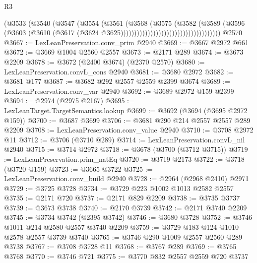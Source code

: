 \begin{lexlean}{R3}
\begin{coremodule}
                                                  (@3533
                                                    (@3540
                                                      (@3547
                                                        (@3554
                                                          (@3561
                                                            (@3568
                                                              (@3575
                                                                (@3582
                                                                  (@3589
                                                                    (@3596
                                                                      (@3603
                                                                        (@3610
                                                                          (@3617
                                                                            (@3624
                                                                              @3625)))))))))))))))))))))))))))))))))))))
    @2570
@3667 := LexLeanPreservation.conv_prim @2940
@3669 := @3667 @2972 @661
@3672 := @3669 @1004 @2560 @2557
@3673 := @2171 @289
@3674 := @3673 @2209
@3678 := @3672 (@2400 @3674) (@2370 @2570)
@3680 := LexLeanPreservation.convL_cons @2940
@3681 := @3680 @2972
@3682 := @3681 @177
@3687 := @3682 @292 @2557 @2559 @2399 @3674
@3689 := LexLeanPreservation.conv_var @2940
@3692 := @3689 @2972 @159 @2399
@3694 := @2974 (@2975 @2167)
@3695 := LexLeanTarget.TargetSemantics.lookup
@3699 := @3692 (@3694 (@3695 @2972 @159))
@3700 := @3687 @3699
@3706 := @3681 @290 @214 @2557 @2557 @289 @2209
@3708 := LexLeanPreservation.conv_value @2940
@3710 := @3708 @2972 @11
@3712 := @3706 (@3710 @289)
@3714 := LexLeanPreservation.convL_nil @2940
@3715 := @3714 @2972
@3718 := @3678 (@3700 (@3712 @3715))
@3719 := LexLeanPreservation.prim_natEq
@3720 := @3719 @2173
@3722 := @3718 (@3720 @159)
@3723 := @3665 @3722
@3725 := LexLeanPreservation.conv_build @2940
@3728 := @2964 (@2968 @2410) @2971
@3729 := @3725 @3728
@3734 := @3729 @223 @1002 @1013 @2582 @2557
@3735 := @2171 @720
@3737 := @2171 @829 @2209
@3738 := @3735 @3737
@3739 := @3673 @3738
@3740 := @2170 @3739
@3742 := @2171 @3740 @2209
@3745 := @3734 @3742 (@2395 @3742)
@3746 := @3680 @3728
@3752 := @3746 @1011 @214 @2580 @2557 @3740 @2209
@3759 := @3729 @183 @124 @1010 @2578 @2557 @3739 @3740
@3765 := @3746 @290 @1009 @2557 @2560 @289 @3738
@3767 := @3708 @3728 @11
@3768 := @3767 @289
@3769 := @3765 @3768
@3770 := @3746 @721
@3775 := @3770 @832 @2557 @2559 @720 @3737

\end{coremodule}
\end{lexlean}
